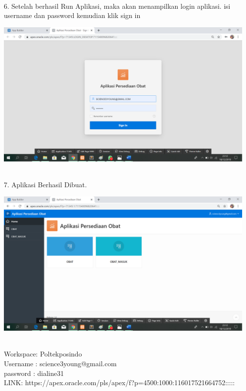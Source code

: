 \documentclass{article}
\begin{document}
\\
6. Setelah berhasil Run Aplikasi, maka akan menampilkan login aplikasi. isi username dan password kemudian klik sign in
\begin{center}
    \includegraphics[width=13cm]{figure/8.png}
\end{center}
\\
7. Aplikasi Berhasil Dibuat.
\begin{center}
    \includegraphics[width=13cm]{figure/9.png}
\end{center}
\\
Workspace: Poltekposindo\\
Username : science3young@gmail.com\\
password : dialine31\\
LINK: https://apex.oracle.com/pls/apex/f?p=4500:1000:116017521664752:::::











 
\end{document}
